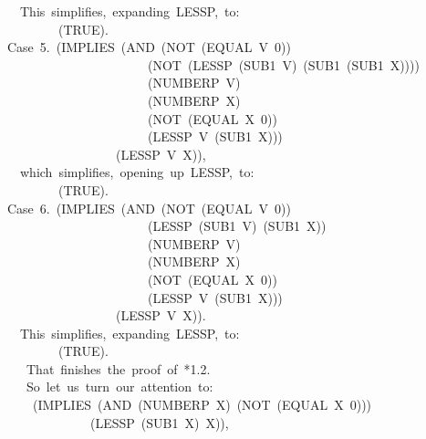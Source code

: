 \documentclass[10pt]{book}
\newenvironment{pubasis}{\begin{flushleft}}{\end{flushleft}}
\begin{document}
\begin{pubasis}
~~~~This~simplifies,~expanding~LESSP,~to:\\

~~~~~~~~~~(TRUE).\\

~~Case~5.~(IMPLIES~(AND~(NOT~(EQUAL~V~0))\\
~~~~~~~~~~~~~~~~~~~~~~~~(NOT~(LESSP~(SUB1~V)~(SUB1~(SUB1~X))))\\
~~~~~~~~~~~~~~~~~~~~~~~~(NUMBERP~V)\\
~~~~~~~~~~~~~~~~~~~~~~~~(NUMBERP~X)\\
~~~~~~~~~~~~~~~~~~~~~~~~(NOT~(EQUAL~X~0))\\
~~~~~~~~~~~~~~~~~~~~~~~~(LESSP~V~(SUB1~X)))\\
~~~~~~~~~~~~~~~~~~~(LESSP~V~X)),\\

~~~~which~simplifies,~opening~up~LESSP,~to:\\

~~~~~~~~~~(TRUE).\\

~~Case~6.~(IMPLIES~(AND~(NOT~(EQUAL~V~0))\\
~~~~~~~~~~~~~~~~~~~~~~~~(LESSP~(SUB1~V)~(SUB1~X))\\
~~~~~~~~~~~~~~~~~~~~~~~~(NUMBERP~V)\\
~~~~~~~~~~~~~~~~~~~~~~~~(NUMBERP~X)\\
~~~~~~~~~~~~~~~~~~~~~~~~(NOT~(EQUAL~X~0))\\
~~~~~~~~~~~~~~~~~~~~~~~~(LESSP~V~(SUB1~X)))\\
~~~~~~~~~~~~~~~~~~~(LESSP~V~X)).\\

~~~~This~simplifies,~expanding~LESSP,~to:\\

~~~~~~~~~~(TRUE).\\

~~~~~That~finishes~the~proof~of~*1.2.\\

~~~~~So~let~us~turn~our~attention~to:\\

~~~~~~(IMPLIES~(AND~(NUMBERP~X)~(NOT~(EQUAL~X~0)))\\
~~~~~~~~~~~~~~~(LESSP~(SUB1~X)~X)),\\


\end{pubasis}
\end{document}

